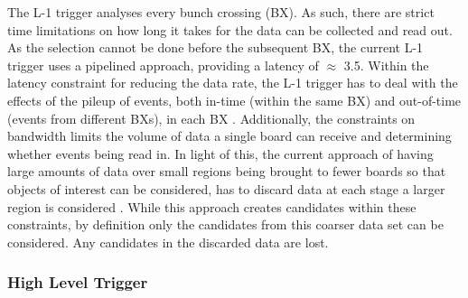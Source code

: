 The L-1 trigger analyses every bunch crossing (BX). 
As such, there are strict time limitations on how long it takes for the data can be collected and read out. 
As the selection cannot be done before the subsequent BX, the current L-1 trigger uses a pipelined approach, providing a latency of $\approx$ 3.5\mus . 
Within the latency constraint for reducing the data rate, the L-1 trigger has to deal with the effects of the pileup of events, both in-time (within the same BX) and out-of-time (events from different BXs), in each BX . 
Additionally, the constraints on bandwidth limits the volume of data a single board can receive and determining whether events being read in. 
In light of this, the current approach of having large amounts of data over small regions being brought to fewer boards so that objects of interest can be considered, has to discard data at each stage a larger region is considered . 
While this approach creates candidates within these constraints, by definition only the candidates from this coarser data set can be considered. 
Any candidates in the discarded data are lost\cite{oldcms}.

\subsubsection{High Level Trigger}
